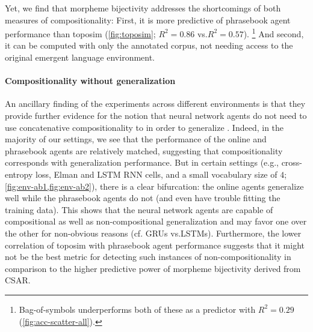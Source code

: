 Yet, we find that morpheme bijectivity addresses the shortcomings of both measures of compositionality:
First, it is more predictive of phrasebook agent performance than toposim (\cref{fig:toposim}; $R^2=0.86$ vs.\@ $R^2=0.57$).
\unskip\footnote{Bag-of-symbols underperforms both of these as a predictor with $R^2=0.29$ (\cref{fig:acc-scatter-all}).}
And second, it can be computed with only the annotated corpus, not needing access to the original emergent language environment.


\paragraph{Compositionality without generalization}%
\label{sec:pb-comp-res}
An ancillary finding of the experiments across different environments is that they provide further evidence for the notion that neural network agents do not need to use concatenative compositionality to in order to generalize \citep{kharitonov-baroni-2020-emergent}.
Indeed, in the majority of our settings, we see that the performance of the online and phrasebook agents are relatively matched, suggesting that compositionality corresponds with generalization performance.
But in certain settings (e.g., cross-entropy loss, Elman and LSTM RNN cells, and a small vocabulary size of $4$; \cref{fig:env-ab1,fig:env-ab2}), there is a clear bifurcation: the online agents generalize well while the phrasebook agents do not (and even have trouble fitting the training data).
This shows that the neural network agents are capable of compositional as well as non-compositional generalization and may favor one over the other for non-obvious reasons (cf. GRUs vs.\@ LSTMs).
Furthermore, the lower correlation of toposim with phrasebook agent performance suggests that it might not be the best metric for detecting such instances of non-compositionality in comparison to the higher predictive power of morpheme bijectivity derived from CSAR\@.



